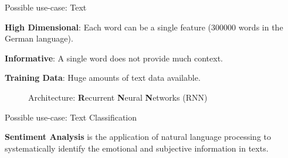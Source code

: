 \documentclass[11pt,compress,t,notes=noshow, xcolor=table]{beamer}
\begin{document}
\begin{framei} {Possible use-case: Text}
\item \textbf{High Dimensional}: Each word can be a single feature (300000 words in the German language).
\item \textbf{Informative}: A single word does not provide much context.
\item \textbf{Training Data}: Huge amounts of text data available.
\begin{figure}
\centering
{}
\caption{Architecture: \textbf{R}ecurrent \textbf{N}eural \textbf{N}etworks (RNN)}
\end{figure}
\end{framei}

\begin{frame} {Possible use-case: Text Classification}
\vspace{1cm}
\begin{figure}
\centering
{}
\end{figure}

\vspace{.5cm}

\textbf{Sentiment Analysis} is the application of natural language processing to systematically identify the emotional and subjective information in texts.

\end{frame}
\end{document}
